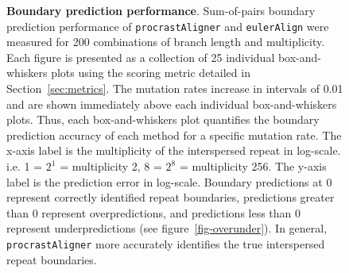 \documentclass{llncs}
\begin{document}
\begin{figure}[t!]
\centering
{}
\caption{\textbf{Boundary prediction performance}. Sum-of-pairs boundary prediction performance of \texttt{procrastAligner} and \texttt{eulerAlign} were measured for 200 combinations of branch length and multiplicity. Each figure is presented as a collection of 25 individual box-and-whiskers plots using the scoring metric detailed in Section~\ref{sec:metrics}. The  mutation rates increase in intervals of 0.01 and are shown immediately above each individual box-and-whiskers plots. Thus, each box-and-whiskers plot quantifies the boundary prediction accuracy of each method for a specific mutation rate. The x-axis label is the multiplicity of the interspersed repeat in log-scale. i.e. 1 = $2^{1}$ = multiplicity 2, 8 = $2^{8}$ = multiplicity 256. The y-axis label is the prediction error in log-scale. Boundary predictions at 0 represent correctly identified repeat boundaries, predictions greater than 0 represent overpredictions, and predictions less than 0 represent underpredictions (see figure~\ref{fig-overunder}). In general, \texttt{procrastAligner} more accurately identifies the true interspersed repeat boundaries.}
\label{fig-boundary}
\end{figure}
\end{document}
